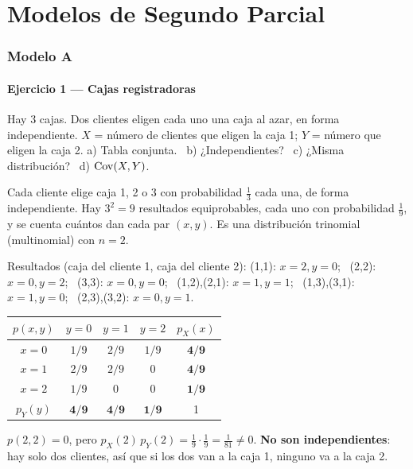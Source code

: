 \newpage
\part{Modelos de Segundo Parcial}
\section{Modelo A}

\subsection{Ejercicio 1 --- Cajas registradoras}
\begin{enun}
Hay 3 cajas. Dos clientes eligen cada uno una caja al azar, en forma independiente. $X$ = número de clientes que eligen la caja 1; $Y$ = número que eligen la caja 2.
a) Tabla conjunta. \ b) ¿Independientes? \ c) ¿Misma distribución? \ d) $\mathrm{Cov}(X,Y)$.
\end{enun}
\begin{metodo}
Cada cliente elige caja 1, 2 o 3 con probabilidad $\frac13$ cada una, de forma independiente. Hay $3^2=9$ resultados equiprobables, cada uno con probabilidad $\frac19$, y se cuenta cuántos dan cada par $(x,y)$. Es una distribución trinomial (multinomial) con $n=2$.
\end{metodo}
Resultados (caja del cliente 1, caja del cliente 2):
(1,1): $x=2,y=0$; \ (2,2): $x=0,y=2$; \ (3,3): $x=0,y=0$; \ (1,2),(2,1): $x=1,y=1$; \ (1,3),(3,1): $x=1,y=0$; \ (2,3),(3,2): $x=0,y=1$.
\begin{center}
\renewcommand{\arraystretch}{1.3}
\begin{tabular}{@{}c|ccc|c@{}}
\toprule
$p(x,y)$ & $y=0$ & $y=1$ & $y=2$ & $p_X(x)$\\\midrule
$x=0$ & $1/9$ & $2/9$ & $1/9$ & $\mathbf{4/9}$\\
$x=1$ & $2/9$ & $2/9$ & $0$ & $\mathbf{4/9}$\\
$x=2$ & $1/9$ & $0$ & $0$ & $\mathbf{1/9}$\\\midrule
$p_Y(y)$ & $\mathbf{4/9}$ & $\mathbf{4/9}$ & $\mathbf{1/9}$ & 1\\\bottomrule
\end{tabular}
\end{center}
$p(2,2)=0$, pero $p_X(2)\,p_Y(2)=\frac19\cdot\frac19=\frac1{81}\neq0$. \textbf{No son independientes}: hay solo dos clientes, así que si los dos van a la caja 1, ninguno va a la caja 2.

